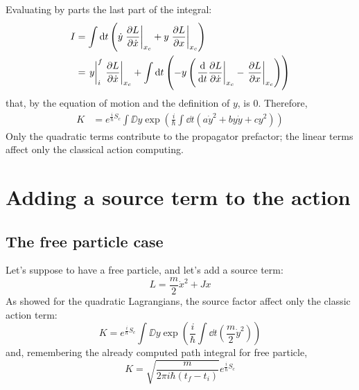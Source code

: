 \documentclass[main.tex]{subfiles}
\begin{document}
Evaluating by parts the last part of the integral:
%
\begin{align}
I &= \int \dd{t} \left( \dot{y} \eval{\pdv{L}{\dot{x}}}_{x_c} + y \eval{\pdv{L}{x}}_{x_c} \right) \\
&= \eval{y}_i^f \eval{\pdv{L}{\dot{x}}}_{x_c} + \int \dd{t} \left( -y \left( \eval{\dv{t}\pdv{L}{\dot{x}}}_{x_c} - \eval{\pdv{L}{x}}_{x_c} \right) \right)
\end{align}
that, by the equation of motion and the definition of $y$, is 0. Therefore,
\begin{align}
K &= e^{\frac{i}{\hbar} S_c }\int \DD{y} \exp( \frac{i}{\hbar} \int \dd{t} (a\dot{y}^2 + by\dot{y} + cy^2) )
\end{align}
Only the quadratic terms contribute to the propagator prefactor; the linear terms affect only the classical action computing.

\section{Adding a source term to the action}
\subsection{The free particle case}
Let's suppose to have a free particle, and let's add a source term:
\begin{equation}
L = \frac{m}{2} \dot{x}^2 + Jx
\end{equation}
As showed for the quadratic Lagrangians, the source factor affect only the classic action term:
\begin{equation}
K =  e^{\frac{i}{\hbar} S_c }\int \DD{y} \exp( \frac{i}{\hbar} \int \dd{t} (\frac{m}{2}\dot{y}^2) )
\end{equation}
and, remembering the already computed path integral for free particle,
\begin{equation}
K = \sqrt{\frac{m}{2\pi i \hbar (t_f-t_i)}} e^{\frac{i}{\hbar} S_c }
\end{equation}
\end{document}
